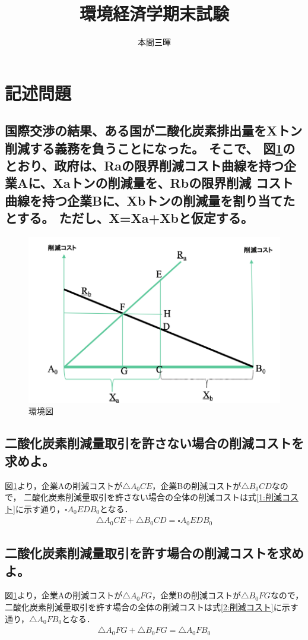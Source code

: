 \documentclass[titlepage,a4paper]{jsarticle}
\title{環境経済学期末試験}
\author{本間三暉}
\begin{document}
\maketitle
\section{記述問題}
\subsection*{国際交渉の結果、ある国が二酸化炭素排出量をXトン削減する義務を負うことになった。
  そこで、 図\ref{環境図}のとおり、政府は、Raの限界削減コスト曲線を持つ企業Aに、Xaトンの削減量を、Rbの限界削減 コスト曲線を持つ企業Bに、Xbトンの削減量を割り当てたとする。
  ただし、X=Xa+Xbと仮定する。}
\begin{figure}[H]
  \centering
  \includegraphics[width=12cm]{img/env.png}
  \caption{環境図}
  \label{環境図}
\end{figure}

\subsection{二酸化炭素削減量取引を許さない場合の削減コストを求めよ。}\label{問一}
図\ref{環境図}より，企業Aの削減コストが$\triangle A_0CE$，企業Bの削減コストが$\triangle B_0CD$なので，
二酸化炭素削減量取引を許さない場合の全体の削減コストは式\eqref{1:削減コスト}に示す通り，$\square A_0EDB_0$となる．
\begin{align}
  \triangle A_0CE + \triangle B_0CD = \square A_0EDB_0 \label{1:削減コスト}
\end{align}

\subsection{二酸化炭素削減量取引を許す場合の削減コストを求めよ。}\label{問二}
図\ref{環境図}より，企業Aの削減コストが$\triangle A_0FG$，企業Bの削減コストが$\triangle B_0FG$なので，
二酸化炭素削減量取引を許す場合の全体の削減コストは式\eqref{2:削減コスト}に示す通り，$\triangle A_0FB_0$となる．
\begin{align}
  \triangle A_0FG + \triangle B_0FG = \triangle A_0FB_0 \label{2:削減コスト}
\end{align}
\end{document}
